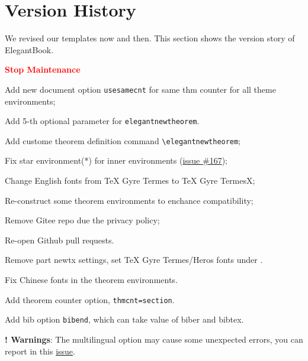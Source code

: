 \documentclass[11pt]{elegantbook}
\begin{document}
\chapter{Version History}
We revised our templates now and then. This section shows the version story of ElegantBook.


  \textcolor{red}{\bfseries Stop Maintenance}

\begin{change}
  \item Add new document option \lstinline|usesamecnt| for same thm counter for all theme environments;
  \item Add 5-th optional parameter for \lstinline|elegantnewtheorem|.
\end{change}



\begin{change}
  \item Add custome theorem definition command \lstinline{\elegantnewtheorem};
  \item Fix star environment(*) for inner environments (\href{https://github.com/ElegantLaTeX/ElegantBook/issues/167}{issue \#167});
  \item Change English fonts from TeX Gyre Termes to TeX Gyre TermesX;
  \item Re-construct some theorem environments to enchance compatibility;
  \item Remove Gitee repo due the privacy policy;
  \item Re-open Github pull requests.
\end{change}





\begin{change}
  \item Remove part newtx settings, set TeX Gyre Termes/Heros fonts under .
  \item Fix Chinese fonts in the theorem environments.
  \item Add theorem counter option, \lstinline{thmcnt=section}.
  \item Add bib option \lstinline{bibend}, which can take value of biber and bibtex.
  \item \textbf{! Warnings}: The multilingual option may cause some unexpected errors, you can report in this \href{https://github.com/ElegantLaTeX/ElegantBook/issues/170}{issue}.
\end{change}
\end{document}
